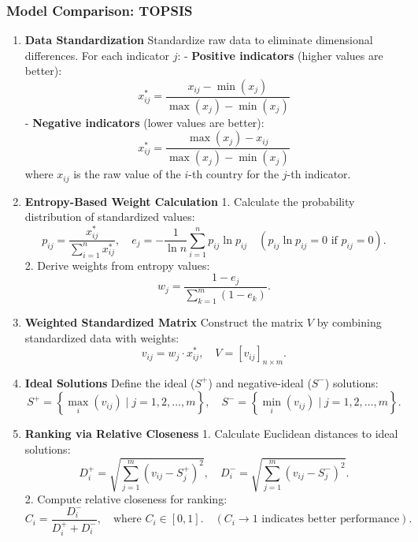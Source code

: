     \subsubsection{Model Comparison: TOPSIS} %
        \begin{enumerate}
            \item \textbf{Data Standardization}
                Standardize raw data to eliminate dimensional differences.
                For each indicator \(j\):
                - \textbf{Positive indicators} (higher values are better):
                \[
                    x_{ij}^* = \frac{x_{ij} - \min(x_j)}{\max(x_j) - \min(x_j)}
                \]
                - \textbf{Negative indicators} (lower values are better):
                \[
                    x_{ij}^* = \frac{\max(x_j) - x_{ij}}{\max(x_j) - \min(x_j)}
                \]
                where \(x_{ij}\) is the raw value of the \(i\)-th country for the \(j\)-th indicator.
            \item \textbf{Entropy-Based Weight Calculation}
                1. Calculate the probability distribution of standardized values:
                \[
                    p_{ij} = \frac{x_{ij}^*}{\sum_{i=1}^n x_{ij}^*}, \quad e_j = -\frac{1}{\ln n} \sum_{i=1}^n p_{ij} \ln p_{ij} \quad (p_{ij} \ln p_{ij} = 0 \text{ if } p_{ij}=0).
                \]
                2. Derive weights from entropy values:
                \[
                    w_j = \frac{1 - e_j}{\sum_{k=1}^m (1 - e_k)}.
                \]
            \item \textbf{Weighted Standardized Matrix}
                Construct the matrix \(V\) by combining standardized data with weights:
                \[
                    v_{ij} = w_j \cdot x_{ij}^*, \quad V = [v_{ij}]_{n \times m}.
                \]
            \item \textbf{Ideal Solutions}
                Define the ideal (\(S^+\)) and negative-ideal (\(S^-\)) solutions:
                \[
                    S^+ = \left\{ \max_{i}(v_{ij}) \mid j=1,2,\dots,m \right\}, \quad S^- = \left\{ \min_{i}(v_{ij}) \mid j=1,2,\dots,m \right\}.
                \]
            \item \textbf{Ranking via Relative Closeness}
                1. Calculate Euclidean distances to ideal solutions:
                \[
                    D_i^+ = \sqrt{\sum_{j=1}^m (v_{ij} - S_j^+)^2}, \quad D_i^- = \sqrt{\sum_{j=1}^m (v_{ij} - S_j^-)^2}.
                \]
                2. Compute relative closeness for ranking:
                \[
                    C_i = \frac{D_i^-}{D_i^+ + D_i^-}, \quad \text{where } C_i \in [0,1]. \quad (C_i \to 1 \text{ indicates better performance}).
                \]
        \end{enumerate}

